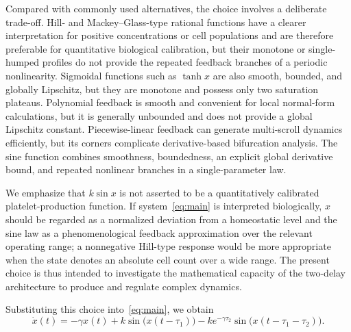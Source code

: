 \documentclass[11pt]{article}
\theoremstyle{remark}
\begin{document}
{Compared with commonly used alternatives, the choice involves a deliberate trade-off. Hill- and Mackey--Glass-type rational functions have a clearer interpretation for positive concentrations or cell populations and are therefore preferable for quantitative biological calibration, but their monotone or single-humped profiles do not provide the repeated feedback branches of a periodic nonlinearity. Sigmoidal functions such as $\tanh x$ are also smooth, bounded, and globally Lipschitz, but they are monotone and possess only two saturation plateaus. Polynomial feedback is smooth and convenient for local normal-form calculations, but it is generally unbounded and does not provide a global Lipschitz constant. Piecewise-linear feedback can generate multi-scroll dynamics efficiently, but its corners complicate derivative-based bifurcation analysis. The sine function combines smoothness, boundedness, an explicit global derivative bound, and repeated nonlinear branches in a single-parameter law.

We emphasize that $k\sin x$ is not asserted to be a quantitatively calibrated platelet-production function. If system~\eqref{eq:main} is interpreted biologically, $x$ should be regarded as a normalized deviation from a homeostatic level and the sine law as a phenomenological feedback approximation over the relevant operating range; a nonnegative Hill-type response would be more appropriate when the state denotes an absolute cell count over a wide range. The present choice is thus intended to investigate the mathematical capacity of the two-delay architecture to produce and regulate complex dynamics.
}

Substituting this choice into~\eqref{eq:main}, we obtain
\begin{equation}
	\dot{x}(t)
	= -\gamma x(t)
	+ k\sin\big(x(t - \tau_1)\big)
	- k e^{-\gamma \tau_2}\sin\big(x(t - \tau_1 - \tau_2)\big).
	\label{eq:sinx}
\end{equation}
\end{document}

